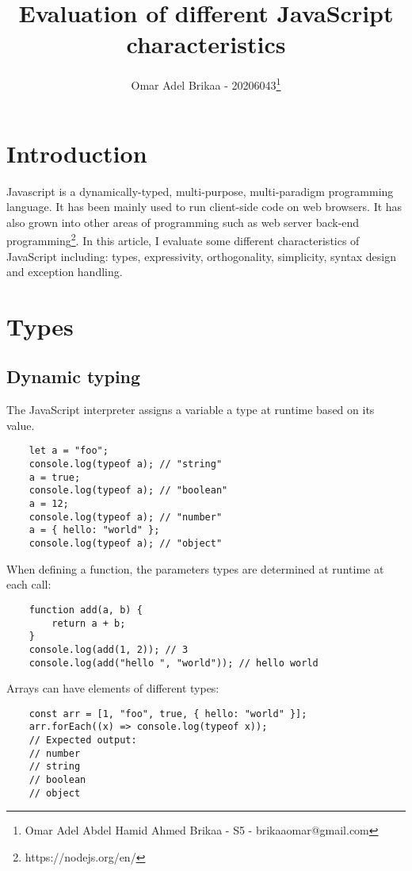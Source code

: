 \documentclass[11pt,a4paper]{article}
\begin{document}
\title{Evaluation of different JavaScript characteristics}
\author{Omar Adel Brikaa - 20206043\thanks{Omar Adel Abdel Hamid Ahmed Brikaa - S5 - brikaaomar@gmail.com}}
\date{}
\maketitle

\tableofcontents

\section{Introduction}
Javascript is a dynamically-typed, multi-purpose, multi-paradigm programming language.
It has been mainly used to run client-side code on web browsers.
It has also grown into other areas of programming such as web server back-end programming\footnote{https://nodejs.org/en/}.
In this article, I evaluate some different characteristics of JavaScript including:
types, expressivity, orthogonality, simplicity, syntax design and exception handling.

\section{Types}

\subsection{\label{dynamic_typing}Dynamic typing}
The JavaScript interpreter assigns a variable a type at runtime based on its value.
\begin{verbatim}
    let a = "foo";
    console.log(typeof a); // "string"
    a = true;
    console.log(typeof a); // "boolean"
    a = 12;
    console.log(typeof a); // "number"
    a = { hello: "world" };
    console.log(typeof a); // "object"
\end{verbatim}
When defining a function, the parameters types are determined at runtime at each call:
\begin{verbatim}
    function add(a, b) {
        return a + b;
    }
    console.log(add(1, 2)); // 3
    console.log(add("hello ", "world")); // hello world
\end{verbatim}
Arrays can have elements of different types:
\begin{verbatim}
    const arr = [1, "foo", true, { hello: "world" }];
    arr.forEach((x) => console.log(typeof x));
    // Expected output:
    // number
    // string
    // boolean
    // object
\end{verbatim}
\end{document}
